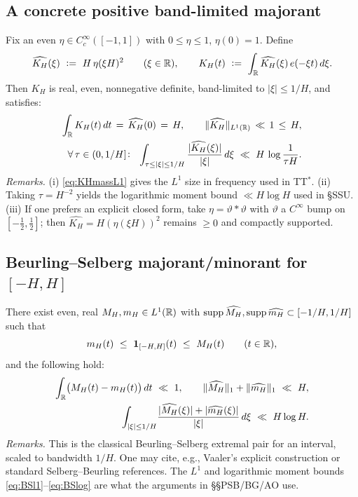 \subsection*{A concrete positive band-limited majorant}\label{subsec:KH}

Fix an even $\eta\in C_c^\infty([-1,1])$ with $0\le \eta\le 1$, $\eta(0)=1$. Define
\[
  \widehat{K_H}(\xi)\ :=\ H\,\eta(\xi H)^2 \qquad (\xi\in\mathbb{R}),\qquad
  K_H(t)\ :=\ \int_{\mathbb{R}}\widehat{K_H}(\xi)\,e(-\xi t)\,d\xi.
\]
Then $K_H$ is real, even, nonnegative definite, band-limited to $|\xi|\le 1/H$, and satisfies:
\begin{align}
  \int_{\R} K_H(t)\,dt \,=\, \widehat{K_H}(0)\,=\,H, \qquad
  \|\widehat{K_H}\|_{L^1(\R)} \,\ll\, 1 \,\le\, H, \label{eq:KHmassL1}\\
  \forall\,\tau\in(0,1/H]\!:\ \ 
  \int_{\tau\le |\xi|\le 1/H}\frac{|\widehat{K_H}(\xi)|}{|\xi|}\,d\xi \ \ll\ H\,\log\frac{1}{\tau H}.
  \label{eq:KHlogmom}
\end{align}
\emph{Remarks.} (i) \eqref{eq:KHmassL1} gives the $L^1$ size in frequency used in TT$^\ast$.  
(ii) Taking $\tau=H^{-2}$ yields the logarithmic moment bound $ \ll H\log H$ used in §SSU.  
(iii) If one prefers an explicit closed form, take $\eta=\vartheta\!\ast\!\vartheta$ with $\vartheta$ a $C^\infty$ bump on $[-\tfrac12,\tfrac12]$; then $\widehat{K_H}=H(\eta(\xi H))^2$ remains $\ge 0$ and compactly supported.

\subsection*{Beurling–Selberg majorant/minorant for \texorpdfstring{$[-H,H]$}{[-H,H]}}\label{subsec:BS}

There exist even, real $M_H,m_H\in L^1(\mathbb{R})$ with $\operatorname{supp}\widehat{M_H},\operatorname{supp}\widehat{m_H}\subset[-1/H,1/H]$ such that
\begin{equation}\label{eq:BSsandwich}
  m_H(t)\ \le\ \mathbf{1}_{[-H,H]}(t)\ \le\ M_H(t)\qquad (t\in\mathbb{R}),
\end{equation}
and the following hold:
\begin{align}
  \int_{\R}\!\big(M_H(t)-m_H(t)\big)\,dt \ \ll\ 1, \qquad
  \|\widehat{M_H}\|_{1}+\|\widehat{m_H}\|_{1}\ \ll\ H, \label{eq:BSl1}\\
  \int_{|\xi|\le 1/H}\!\frac{|\widehat{M_H}(\xi)|+|\widehat{m_H}(\xi)|}{|\xi|}\,d\xi \ \ll\ H\log H. \label{eq:BSlog}
\end{align}
\emph{Remarks.} This is the classical Beurling–Selberg extremal pair for an interval, scaled to bandwidth $1/H$. One may cite, e.g., Vaaler’s explicit construction or standard Selberg–Beurling references. The $L^1$ and logarithmic moment bounds \eqref{eq:BSl1}–\eqref{eq:BSlog} are what the arguments in §§PSB/BG/AO use.

